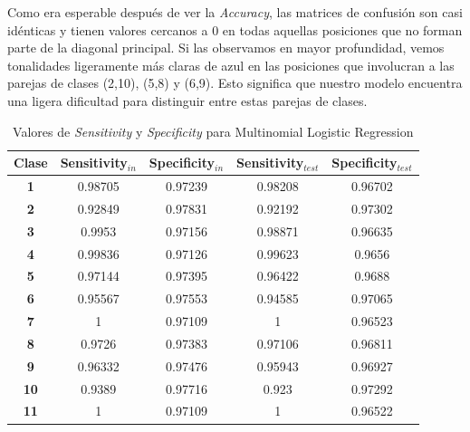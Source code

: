 \documentclass[10pt,a4paper]{article}
\begin{document}
Como era esperable después de ver la \textit{Accuracy}, las matrices de confusión son casi idénticas y tienen valores cercanos a 0 en todas aquellas posiciones que no forman parte de la diagonal principal. Si las observamos en mayor profundidad, vemos tonalidades ligeramente más claras de azul en las posiciones que involucran a las parejas de clases (2,10), (5,8) y (6,9). Esto significa que nuestro modelo encuentra una ligera dificultad para distinguir entre estas parejas de clases.

\begin{table}[h]
	\centering
	\begin{tabular}{|c|c|c|c|c|}
		\hline
		\textbf{Clase} & \textbf{Sensitivity$_{in}$} & \textbf{Specificity$_{in}$} & \textbf{Sensitivity$_{test}$} & \textbf{Specificity$_{test}$} \\ \hline
		\textbf{1}     & 0.98705                     & 0.97239                     & 0.98208                       & 0.96702                       \\ \hline
		\textbf{2}     & 0.92849                     & 0.97831                     & 0.92192                       & 0.97302                       \\ \hline
		\textbf{3}     & 0.9953                      & 0.97156                     & 0.98871                       & 0.96635                       \\ \hline
		\textbf{4}     & 0.99836                     & 0.97126                     & 0.99623                       & 0.9656                        \\ \hline
		\textbf{5}     & 0.97144                     & 0.97395                     & 0.96422                       & 0.9688                        \\ \hline
		\textbf{6}     & 0.95567                     & 0.97553                     & 0.94585                       & 0.97065                       \\ \hline
		\textbf{7}     & 1                           & 0.97109                     & 1                             & 0.96523                       \\ \hline
		\textbf{8}     & 0.9726                      & 0.97383                     & 0.97106                       & 0.96811                       \\ \hline
		\textbf{9}     & 0.96332                     & 0.97476                     & 0.95943                       & 0.96927                       \\ \hline
		\textbf{10}    & 0.9389                      & 0.97716                     & 0.923                         & 0.97292                       \\ \hline
		\textbf{11}    & 1                           & 0.97109                     & 1                             & 0.96522                       \\ \hline
	\end{tabular}
	\caption{Valores de \textit{Sensitivity} y \textit{Specificity} para Multinomial Logistic Regression}
	\label{fig:cla_sensit_specif_mlr}
\end{table}
\end{document}
